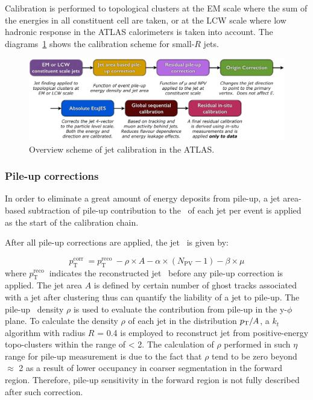 Calibration is performed to topological clusters at the EM scale where the sum of the energies in all constituent cell are taken, or at the LCW scale where low hadronic response in the ATLAS calorimeters is taken into account. The diagrams~\ref{Fig.calib} shows the calibration scheme for small-$R$ jets.

\begin{figure}[htb] 
	\centering  
	\includegraphics[width=15cm]{./fig/calib.png}	\caption{Overview scheme of jet calibration in the ATLAS.}
	\label{Fig.calib}
\end{figure}

\subsubsection{Pile-up corrections}


In order to eliminate a great amount of energy deposits from pile-up, a jet area-based subtraction of pile-up contribution to the \pt~of each jet per event is applied as the start of the calibration chain. 

After all pile-up corrections are applied, the jet \pt~is given by:

\begin{equation}
p_{\mathrm{T}}^{\text {corr }}=p_{\mathrm{T}}^{\text {reco }}-\rho \times A-\alpha \times\left(N_{\mathrm{PV}}-1\right)-\beta \times \mu
\end{equation}
where $p_{\mathrm{T}}^{\text {reco }}$ indicates the reconstructed jet \pt~before any pile-up correction is applied. The jet area $A$ is defined by certain number of ghost tracks associated with a jet after clustering thus can quantify the liability of a jet to pile-up.  The pile-up \pt~density $\rho$ is used to evaluate the contribution from pile-up in the y-$\phi$ plane. To calculate the density $\rho$ of each jet in the distribution $p_{\mathrm{T}}/A$, a $k_t$ algorithm with radius $R$ = 0.4 is employed to reconstruct jet from positive-energy topo-clusters within the range of \abseta < 2. The calculation of $\rho$ performed in such $\eta$ range for pile-up measurement is due to the fact that $\rho$ tend to be zero beyond \abseta~$\approx$ 2 as a result of lower occupancy in coarser segmentation in the forward region. Therefore, pile-up sensitivity in the forward region is not fully described after such correction.  

